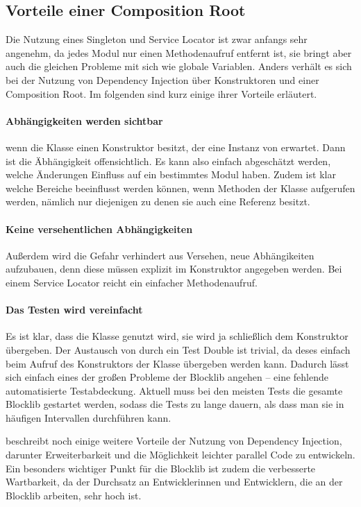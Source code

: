 \subsection{Vorteile einer Composition Root}

Die Nutzung eines Singleton und Service Locator ist zwar anfangs sehr angenehm, da jedes Modul nur einen Methodenaufruf entfernt ist, sie bringt aber auch die gleichen Probleme mit sich wie globale Variablen. Anders verhält es sich bei der Nutzung von Dependency Injection über Konstruktoren und einer Composition Root. Im folgenden sind kurz einige ihrer Vorteile erläutert.

\paragraph{Abhängigkeiten werden sichtbar} wenn die Klasse einen Konstruktor besitzt, der eine Instanz von  erwartet. Dann ist die Äbhängigkeit offensichtlich. Es kann also einfach abgeschätzt werden, welche Änderungen Einfluss auf ein bestimmtes Modul haben. Zudem ist klar welche Bereiche beeinflusst werden können, wenn Methoden der Klasse aufgerufen werden, nämlich nur diejenigen zu denen sie auch eine Referenz besitzt.

\paragraph{Keine versehentlichen Abhängigkeiten} Außerdem wird die Gefahr verhindert aus Versehen, neue Abhängikeiten aufzubauen, denn diese müssen explizit im Konstruktor angegeben werden. Bei einem Service Locator reicht ein einfacher Methodenaufruf.

\paragraph{Das Testen wird vereinfacht} Es ist klar, dass die Klasse  genutzt wird, sie wird ja schließlich dem Konstruktor übergeben. Der Austausch von  durch ein Test Double ist trivial, da deses einfach beim Aufruf des Konstruktors der Klasse übergeben werden kann. Dadurch lässt sich einfach eines der großen Probleme der Blocklib angehen -- eine fehlende automatisierte Testabdeckung. Aktuell muss bei den meisten Tests die gesamte Blocklib gestartet werden, sodass die Tests zu lange dauern, als dass man sie in häufigen Intervallen durchführen kann.

\textcite[S.~15~ff.]{Seemann2012} beschreibt noch einige weitere Vorteile der Nutzung von Dependency Injection, darunter Erweiterbarkeit und die Möglichkeit leichter parallel Code zu entwickeln. Ein besonders wichtiger Punkt für die Blocklib ist zudem die verbesserte Wartbarkeit, da der Durchsatz an Entwicklerinnen und Entwicklern, die an der Blocklib arbeiten, sehr hoch ist.

